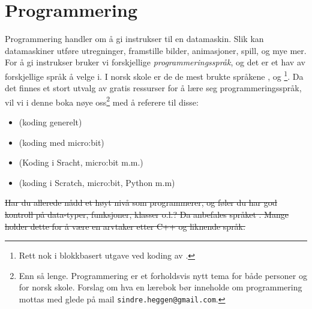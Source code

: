 



\section{Programmering}
Programmering handler om å gi instrukser til en datamaskin. Slik kan datamaskiner utføre utregninger, framstille bilder, animasjoner, spill, og mye mer. For å gi instrukser bruker vi forskjellige \textit{programmeringsspråk}, og det er et hav av forskjellige språk å velge i. I norsk skole er de de mest brukte språkene ,  og \footnote{Rett nok i blokkbasert utgave ved koding av .}. Da det finnes et stort utvalg av gratis ressurser for å lære seg programmeringsspråk, vil vi i denne boka nøye oss\footnote{Enn så lenge. Programmering er et forholdsvis nytt tema for både personer og for norsk skole. Forslag om hva en lærebok bør inneholde om programmering mottas med glede på mail {\tt{sindre.heggen@gmail.com}}.} med å referere til disse:
\begin{itemize}
	\item {} (koding generelt)
	\item {} (koding med micro:bit)
	\item {} (Koding i Sracht, micro:bit m.m.)
	\item {} (koding i Scratch, micro:bit, Python m.m)
\end{itemize} \vsk

\st{Har du allerede nådd et høyt nivå som programmerer, og føler du har god kontroll på data-typer, funksjoner, klasser o.l.? Da anbefales språket . Mange holder dette for å være en arvtaker etter C++ og liknende språk.}



